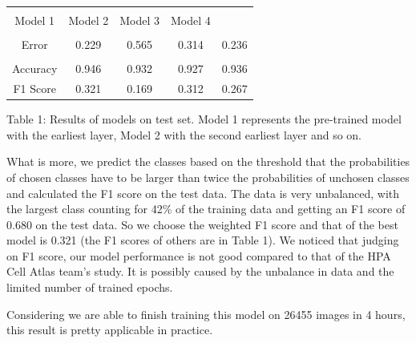 \documentclass{article}
\begin{document}
\begin{table}[ht]
\centering

\begin{tabular}{|c|c|c|c|c|}
    \hline\\
     Model 1 & Model 2&Model 3&Model 4 \\
     \hline\\
     Error&0.229&0.565&0.314&0.236\\
     \hline\\
     Accuracy&0.946&0.932&0.927&0.936\\
      \hline
     F1 Score&0.321&0.169&0.312&0.267\\
     \hline
\end{tabular}

{\raggedright Table 1: Results of models on test set. Model 1 represents the pre-trained model with the earliest layer, Model 2 with the second earliest layer and so on. \par}

\label{table:1}
\end{table}

What is more, we predict the classes based on the threshold that the probabilities of chosen classes have to be larger than twice the probabilities of unchosen classes and calculated the F1 score on the test data. The data is very unbalanced, with the largest class counting for 42\% of the training data and getting an F1 score of 0.680 on the test data. So we choose the weighted F1 score and that of the best model is 0.321 (the F1 scores of others are in Table 1). We noticed that judging on F1 score, our model performance is not good compared to that of the HPA Cell Atlas team's study. It is possibly caused by the unbalance in data and the limited number of trained epochs.

Considering we are able to finish training this model on 26455 images in 4 hours, this result is pretty applicable in practice.
\end{document}
